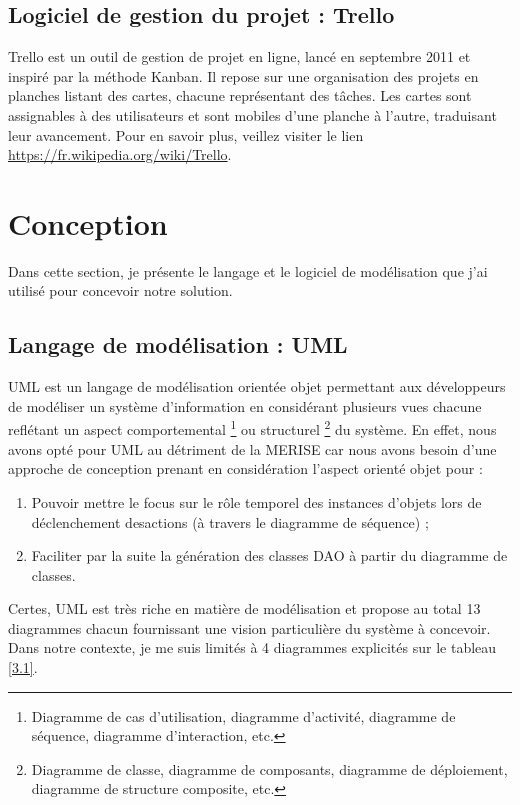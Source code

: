 \documentclass[a4paper, 12pt]{report}
\begin{document}
\subsection{Logiciel de gestion du projet : Trello}
Trello est un outil de gestion de projet en ligne, lancé en septembre 2011 et inspiré par la méthode Kanban. Il repose sur une organisation des projets en planches listant des cartes, chacune représentant des tâches. Les cartes sont assignables à des utilisateurs et sont mobiles d'une planche à l'autre, traduisant leur avancement. Pour en savoir plus, veillez visiter le lien \href{https://fr.wikipedia.org/wiki/Trello}{https://fr.wikipedia.org/wiki/Trello}.

\section{Conception}
Dans cette section, je présente le langage et le logiciel de modélisation que j'ai utilisé pour concevoir notre solution.

\subsection{Langage de modélisation : UML}
UML est un langage de modélisation orientée objet permettant aux développeurs de modéliser un système d’information en considérant plusieurs vues chacune reflétant un aspect comportemental \footnote{Diagramme de cas d’utilisation, diagramme d’activité, diagramme de séquence, diagramme d’interaction, etc.} ou structurel \footnote{Diagramme de classe, diagramme de composants, diagramme de déploiement, diagramme de structure composite, etc.} du système.
\newline
En effet, nous avons opté pour UML au détriment de la MERISE car nous avons besoin
d’une approche de conception prenant en considération l’aspect orienté objet pour :
\begin{enumerate}
\item Pouvoir mettre le focus sur le rôle temporel des instances d’objets lors de déclenchement desactions (à travers le diagramme de séquence) ;
\item Faciliter par la suite la génération des classes DAO à partir du diagramme de classes.
\end{enumerate}
Certes, UML est très riche en matière de modélisation et propose au total 13 diagrammes chacun fournissant une vision particulière du système à concevoir. Dans notre contexte, je me suis limités à 4 diagrammes explicités sur le tableau \ref{3.1}.
\end{document}
